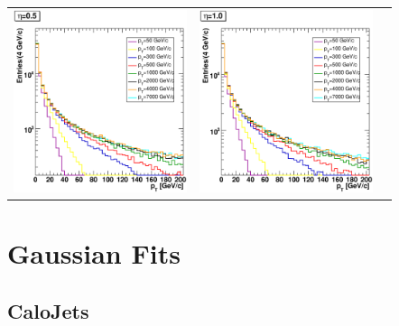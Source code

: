 \documentclass{cmspaper}
\begin{document}
\begin{appendices}
\begin{center}
\begin{tabular}{lll}
 \includegraphics[width=2in]{figs/h_ConstituentpT_ET_py_corr_eta0.5_zoomed.eps} &
 \includegraphics[width=2in]{figs/h_ConstituentpT_ET_py_corr_eta1.0_zoomed.eps} \\
\end{tabular}
\end{center}

\section{Gaussian Fits}
\label{app:fits}

\subsection{CaloJets}


\end{appendices}
\end{document}
